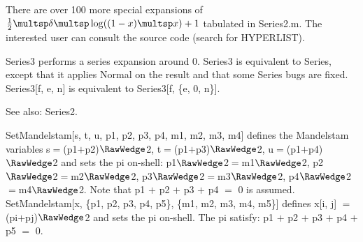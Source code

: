 
There are over 100 more special expansions of \(\frac{1}{2}\multsp \delta \multsp \log((1-x)\multsp x)+1\) tabulated in Series2.m. The interested
user can consult the source code (search for HYPERLIST).



Series3 performs a series expansion around 0. Series3 is equivalent to Series, except that it applies Normal on the result and that some
  Series bugs are fixed. Series3[f, e, n] is equivalent to { }Series3[f, \{e, 0, n\}].



See also:  Series2.








SetMandelstam[s, t, u, p1, p2, p3, p4, m1, m2, m3, m4] defines the Mandelstam variables { }s\(=\)(p1\(+\)p2)\(\RawWedge\)2,
  t\(=\)(p1\(+\)p3)\(\RawWedge\)2, u\(=\)(p1\(+\)p4)\(\RawWedge\)2 and sets the pi on-shell: p1\(\RawWedge\)2\(=\)m1\(\RawWedge\)2,
  p2\(\RawWedge\)2\(=\)m2\(\RawWedge\)2, p3\(\RawWedge\)2\(=\)m3\(\RawWedge\)2, p4\(\RawWedge\)2\(=\)m4\(\RawWedge\)2. Note that p1 \(+\)
  { }p2 \(+\) p3 \(+\) p4 \(=\) 0 is assumed.\\
SetMandelstam[x, \{p1, p2, p3, p4, p5\}, \{m1, m2, m3, m4, m5\}] defines x[i, j] \(=\) (pi\(+\)pj)\(\RawWedge\)2 and sets the pi
  on-shell. The pi satisfy: p1 \(+\) p2 \(+\) p3 \(+\) p4 \(+\) p5 \(=\) 0.


